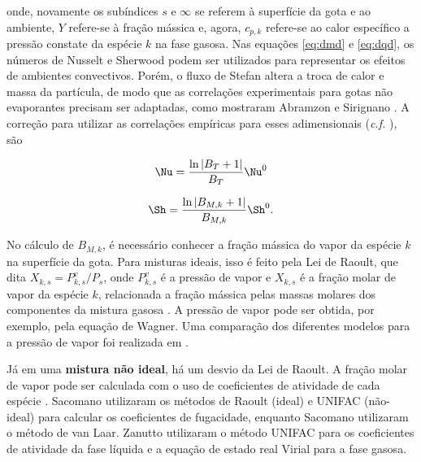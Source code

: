 onde, novamente os subíndices $s$ e $\infty$ se referem à superfície da gota e ao ambiente, $Y$ refere-se à fração mássica e, agora, $c_{p,k}$ refere-se ao calor específico a pressão constate da espécie $k$ na fase gasosa.
Nas equações \eqref{eq:dmd} e \eqref{eq:dqd}, os números de Nusselt e Sherwood podem ser utilizados para representar os efeitos de ambientes convectivos.
Porém, o fluxo de Stefan altera a troca de calor e massa da partícula, de modo que as correlações experimentais para gotas não evaporantes precisam ser adaptadas, como mostraram Abramzon e Sirignano \cite{Sirignano1989}.
A correção para utilizar as correlações empíricas para esses adimensionais  (\emph{c.f.} \cite[eqs. (8) e (9)]{SacomanoF2025CF}), são

\vspace{12pt}
\begin{minipage}{0.45\linewidth}
    \begin{equation}
        \Nu = \frac{\ln \left|B_T + 1\right|}{B_T} \Nu^0 
    \end{equation}
\end{minipage}
\begin{minipage}{0.5\linewidth}
    \begin{equation}
        \Sh = \frac{\ln \left|B_{M,k} + 1\right|}{B_{M,k}}\Sh^0 .
    \end{equation}
\end{minipage}
\vspace{12pt}

No cálculo de $B_{M,k}$, é necessário conhecer a fração mássica do vapor da espécie $k$ na superfície da gota.
Para misturas ideais, isso é feito pela Lei de Raoult, que dita $X_{k,s}=P^v_{k,s}/P_s$, onde $P^v_{k,s}$ é a pressão de vapor e $X_{k,s}$ é a fração molar de vapor da espécie $k$, relacionada a fração mássica pelas massas molares dos componentes da mistura gasosa \cite{Peters2010}.
A pressão de vapor pode ser obtida, por exemplo, pela equação de Wagner.
Uma comparação dos diferentes modelos para a pressão de vapor foi realizada em \cite{SacomanoF2019IJHMT}.

Já em uma \textbf{mistura não ideal}, há um desvio da Lei de Raoult. 
A fração molar de vapor pode ser calculada com o uso de coeficientes de atividade de cada espécie \cite{Bird2002}.
Sacomano\etal{} \cite{SacomanoF2022IJHMT} utilizaram os métodos de Raoult (ideal) e UNIFAC (não-ideal) para calcular os coeficientes de fugacidade, enquanto Sacomano\etal{} \cite{SacomanoF2025CF} utilizaram o método de van Laar.
Zanutto\etal{} \cite{ZanuttoC2019} utilizaram o método UNIFAC para os coeficientes de atividade da fase líquida e a equação de estado real Virial para a fase gasosa.


